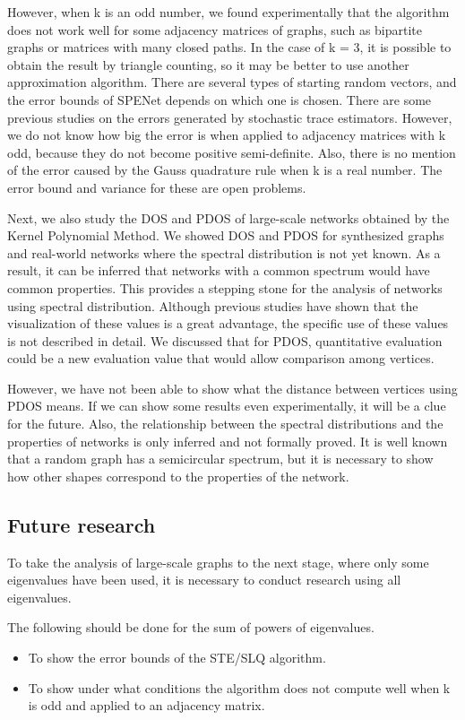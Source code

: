 \documentclass[senior,final,11pt]{iscs-thesis}
\begin{document}
However, when k is an odd number, we found experimentally that the algorithm does not work well for some adjacency matrices of graphs, such as bipartite graphs or matrices with many closed paths. In the case of k = 3, it is possible to obtain the result by triangle counting, so it may be better to use another approximation algorithm. There are several types of starting random vectors, and the error bounds of SPENet depends on which one is chosen. There are some previous studies on the errors generated by stochastic trace estimators. However, we do not know how big the error is when applied to adjacency matrices with k odd, because they do not become positive semi-definite. Also, there is no mention of the error caused by the Gauss quadrature rule when k is a real number. The error bound and variance for these are open problems.

Next, we also study the DOS and PDOS of large-scale networks obtained by the Kernel Polynomial Method. We showed DOS and PDOS for synthesized graphs and real-world networks where the spectral distribution is not yet known. As a result, it can be inferred that networks with a common spectrum would have common properties. This provides a stepping stone for the analysis of networks using spectral distribution.
Although previous studies have shown that the visualization of these values is a great advantage, the specific use of these values is not described in detail. We discussed that for PDOS, quantitative evaluation could be a new evaluation value that would allow comparison among vertices.

However, we have not been able to show what the distance between vertices using PDOS means. If we can show some results even experimentally, it will be a clue for the future. Also, the relationship between the spectral distributions and the properties of networks is only inferred and not formally proved. It is well known that a random graph has a semicircular spectrum, but it is necessary to show how other shapes correspond to the properties of the network.

\subsection*{Future research}
To take the analysis of large-scale graphs to the next stage, where only some eigenvalues have been used, it is necessary to conduct research using all eigenvalues.

The following should be done for the sum of powers of eigenvalues.
\begin{itemize}
    \item To show the error bounds of the STE/SLQ algorithm.
    \item To show under what conditions the algorithm does not compute well when k is odd and applied to an adjacency matrix.
\end{itemize}
\end{document}
